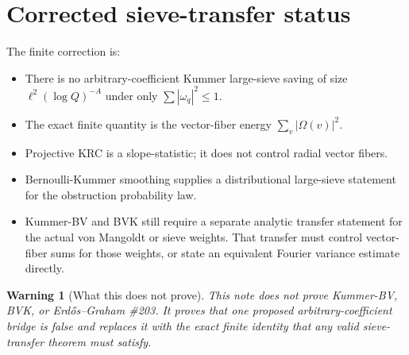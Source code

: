 \documentclass[11pt]{article}
\newtheorem{warning}{Warning}
\begin{document}
\section{Corrected sieve-transfer status}

The finite correction is:

\begin{itemize}[leftmargin=2em]
\item There is no arbitrary-coefficient Kummer large-sieve saving of size \(\ell^2(\log Q)^{-A}\) under only \(\sum|\omega_q|^2\le1\).
\item The exact finite quantity is the vector-fiber energy \(\sum_v|\Omega(v)|^2\).
\item Projective KRC is a slope-statistic; it does not control radial vector fibers.
\item Bernoulli-Kummer smoothing supplies a distributional large-sieve statement for the obstruction probability law.
\item Kummer-BV and BVK still require a separate analytic transfer statement for the actual von Mangoldt or sieve weights.  That transfer must control vector-fiber sums for those weights, or state an equivalent Fourier variance estimate directly.
\end{itemize}

\begin{warning}[What this does not prove]
This note does not prove Kummer-BV, BVK, or Erd\H{o}s--Graham \#203.  It proves that one proposed arbitrary-coefficient bridge is false and replaces it with the exact finite identity that any valid sieve-transfer theorem must satisfy.
\end{warning}
\end{document}
